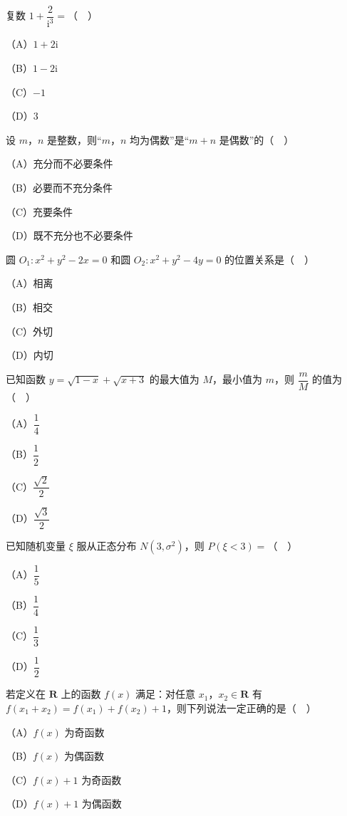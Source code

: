 


\begin{question}
复数 $1+\dfrac2{\mathrm i^3}=$（　）

（A）$1+2\mathrm i$

（B）$1-2\mathrm i$

（C）$-1$

（D）$3$

\end{question}
\begin{question}
设 $m$，$n$ 是整数，则“$m$，$n$ 均为偶数”是“$m+n$ 是偶数”的（　）

（A）充分而不必要条件

（B）必要而不充分条件

（C）充要条件

（D）既不充分也不必要条件

\end{question}
\begin{question}
圆 $O_1:x^2+y^2-2x=0$ 和圆 $O_2:x^2+y^2-4y=0$ 的位置关系是（　）

（A）相离

（B）相交

（C）外切

（D）内切

\end{question}
\begin{question}
已知函数 $y=\sqrt{1-x}+\sqrt{x+3}$ 的最大值为 $M$，最小值为 $m$，则 $\dfrac mM$ 的值为（　）

（A）$\dfrac14$

（B）$\dfrac12$

（C）$\dfrac{\sqrt2}2$

（D）$\dfrac{\sqrt3}2$

\end{question}
\begin{question}
已知随机变量 $\xi$ 服从正态分布 $N(3,\sigma^2)$，则 $P(\xi<3)=$（　）

（A）$\dfrac15$

（B）$\dfrac14$

（C）$\dfrac13$

（D）$\dfrac12$

\end{question}
\begin{question}
若定义在 $\mathbf R$ 上的函数 $f(x)$ 满足：对任意 $x_1$，$x_2\in\mathbf R$ 有 $f(x_1+x_2)=f(x_1)+f(x_2)+1$，则下列说法一定正确的是（　）

（A）$f(x)$ 为奇函数

（B）$f(x)$ 为偶函数

（C）$f(x)+1$ 为奇函数

（D）$f(x)+1$ 为偶函数

\end{question}
